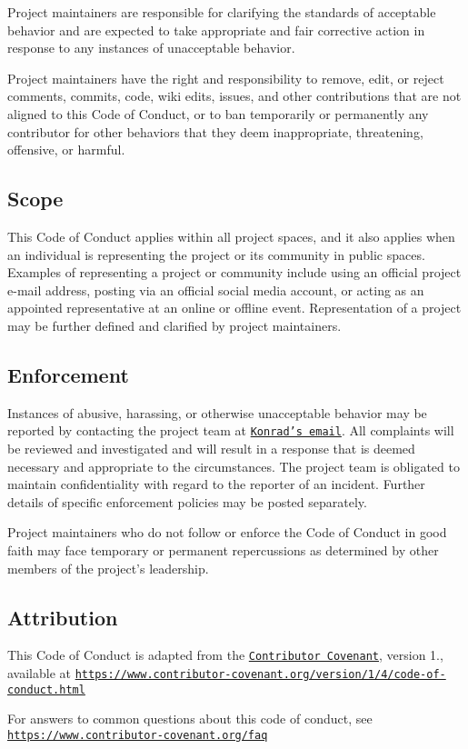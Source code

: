 Project maintainers are responsible for clarifying the standards of acceptable behavior and are expected to take appropriate and fair corrective action in response to any instances of unacceptable behavior.

Project maintainers have the right and responsibility to remove, edit, or reject comments, commits, code, wiki edits, issues, and other contributions that are not aligned to this Code of Conduct, or to ban temporarily or permanently any contributor for other behaviors that they deem inappropriate, threatening, offensive, or harmful.

\subsection*{Scope}

This Code of Conduct applies within all project spaces, and it also applies when an individual is representing the project or its community in public spaces. Examples of representing a project or community include using an official project e-\/mail address, posting via an official social media account, or acting as an appointed representative at an online or offline event. Representation of a project may be further defined and clarified by project maintainers.

\subsection*{Enforcement}

Instances of abusive, harassing, or otherwise unacceptable behavior may be reported by contacting the project team at \href{konradwerys2@gmail.com}{\tt Konrad's email}. All complaints will be reviewed and investigated and will result in a response that is deemed necessary and appropriate to the circumstances. The project team is obligated to maintain confidentiality with regard to the reporter of an incident. Further details of specific enforcement policies may be posted separately.

Project maintainers who do not follow or enforce the Code of Conduct in good faith may face temporary or permanent repercussions as determined by other members of the project's leadership.

\subsection*{Attribution}

This Code of Conduct is adapted from the \href{https://www.contributor-covenant.org>}{\tt Contributor Covenant}, version 1., available at \href{https://www.contributor-covenant.org/version/1/4/code-of-conduct.html}{\tt https\-://www.\-contributor-\/covenant.\-org/version/1/4/code-\/of-\/conduct.\-html}

For answers to common questions about this code of conduct, see \href{https://www.contributor-covenant.org/faq}{\tt https\-://www.\-contributor-\/covenant.\-org/faq} 